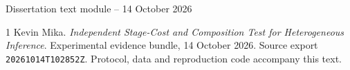\documentclass[10pt]{article}
\begin{document}
{\small Dissertation text module -- 14 October 2026}\par

\begin{thebibliography}{1}
Kevin Mika. \emph{Independent Stage-Cost and Composition Test for Heterogeneous Inference}. Experimental evidence bundle, 14 October 2026. Source export \texttt{20261014T102852Z}. Protocol, data and reproduction code accompany this text.
\end{thebibliography}
\end{document}
